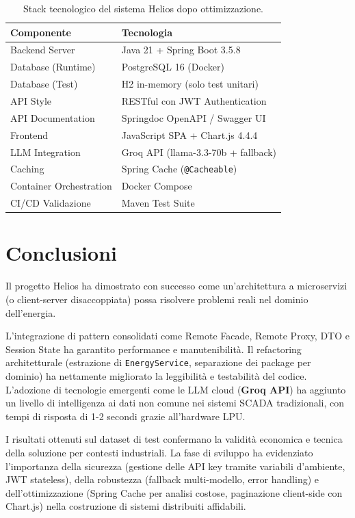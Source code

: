 \documentclass[a4paper,12pt]{report}
\begin{document}
\begin{table}[H]
    \centering
    \begin{tabular}{ll}
        \toprule
        \textbf{Componente} & \textbf{Tecnologia} \\
        \midrule
        Backend Server & Java 21 + Spring Boot 3.5.8 \\
        Database (Runtime) & PostgreSQL 16 (Docker) \\
        Database (Test) & H2 in-memory (solo test unitari) \\
        API Style & RESTful con JWT Authentication \\
        API Documentation & Springdoc OpenAPI / Swagger UI \\
        Frontend & JavaScript SPA + Chart.js 4.4.4 \\
        LLM Integration & Groq API (llama-3.3-70b + fallback) \\
        Caching & Spring Cache (\texttt{@Cacheable}) \\
        Container Orchestration & Docker Compose \\
        CI/CD Validazione & Maven Test Suite \\
        \bottomrule
    \end{tabular}
    \caption{Stack tecnologico del sistema Helios dopo ottimizzazione.}
    \label{tbl:stack}
\end{table}

\chapter{Conclusioni}

Il progetto Helios ha dimostrato con successo come un'architettura a microservizi (o client-server disaccoppiata) possa risolvere problemi reali nel dominio dell'energia.

L'integrazione di pattern consolidati come Remote Facade, Remote Proxy, DTO e Session State ha garantito performance e manutenibilità. Il refactoring architetturale (estrazione di \texttt{EnergyService}, separazione dei package per dominio) ha nettamente migliorato la leggibilità e testabilità del codice. L'adozione di tecnologie emergenti come le LLM cloud (\textbf{Groq API}) ha aggiunto un livello di intelligenza ai dati non comune nei sistemi SCADA tradizionali, con tempi di risposta di 1-2 secondi grazie all'hardware LPU.

I risultati ottenuti sul dataset di test confermano la validità economica e tecnica della soluzione per contesti industriali. La fase di sviluppo ha evidenziato l'importanza della sicurezza (gestione delle API key tramite variabili d'ambiente, JWT stateless), della robustezza (fallback multi-modello, error handling) e dell'ottimizzazione (Spring Cache per analisi costose, paginazione client-side con Chart.js) nella costruzione di sistemi distribuiti affidabili.
\end{document}
